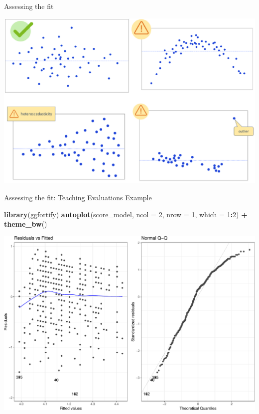 \documentclass[
  ignorenonframetext,
]{beamer}
\newenvironment{Shaded}{\begin{snugshade}}{\end{snugshade}}
\newcommand{\AttributeTok}[1]{\textcolor[rgb]{0.13,0.29,0.53}{#1}}
\newcommand{\DecValTok}[1]{\textcolor[rgb]{0.00,0.00,0.81}{#1}}
\newcommand{\FunctionTok}[1]{\textcolor[rgb]{0.13,0.29,0.53}{\textbf{#1}}}
\newcommand{\NormalTok}[1]{#1}
\newcommand{\SpecialCharTok}[1]{\textcolor[rgb]{0.81,0.36,0.00}{\textbf{#1}}}
\begin{document}
\begin{frame}{Assessing the fit}
\protect\hypertarget{assessing-the-fit-1}{}
\begin{center}\includegraphics[width=0.9\linewidth]{Week4_files/figure-beamer/unnamed-chunk-25-1} \end{center}
\end{frame}

\begin{frame}[fragile]{Assessing the fit: Teaching Evaluations Example}
\protect\hypertarget{assessing-the-fit-teaching-evaluations-example}{}
\tiny

\begin{Shaded}
\begin{Highlighting}[]
\FunctionTok{library}\NormalTok{(ggfortify)}
\FunctionTok{autoplot}\NormalTok{(score\_model, }\AttributeTok{ncol =} \DecValTok{2}\NormalTok{, }\AttributeTok{nrow =} \DecValTok{1}\NormalTok{, }\AttributeTok{which =} \DecValTok{1}\SpecialCharTok{:}\DecValTok{2}\NormalTok{) }\SpecialCharTok{+} \FunctionTok{theme\_bw}\NormalTok{()}
\end{Highlighting}
\end{Shaded}

\begin{center}\includegraphics[width=0.8\linewidth,height=0.5\textheight]{Week4_files/figure-beamer/unnamed-chunk-26-1} \end{center}
\normalsize
\end{frame}
\end{document}
